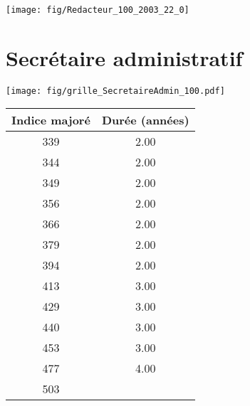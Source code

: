  \vspace{0.1cm} 

 {\hspace{-2.2cm}\texttt{[image: fig/Redacteur\_100\_2003\_22\_0]}} 

\newpage 
 
\chapter{Secrétaire administratif} 

\begin{minipage}{0.55\linewidth}\texttt{[image: fig/grille\_SecretaireAdmin\_100.pdf]}\end{minipage} 
\begin{minipage}{0.3\linewidth} 
 \begin{center} 

\begin{tabular}[htb]{|c|c|} 
\hline 
 Indice majoré &  Durée (années) \\ 
\hline \hline 
 339 &  2.00 \\ 
\hline 
 344 &  2.00 \\ 
\hline 
 349 &  2.00 \\ 
\hline 
 356 &  2.00 \\ 
\hline 
 366 &  2.00 \\ 
\hline 
 379 &  2.00 \\ 
\hline 
 394 &  2.00 \\ 
\hline 
 413 &  3.00 \\ 
\hline 
 429 &  3.00 \\ 
\hline 
 440 &  3.00 \\ 
\hline 
 453 &  3.00 \\ 
\hline 
 477 &  4.00 \\ 
\hline 
 503 &   \\ 
\hline 
\hline 
\end{tabular} 
\end{center} 
 \end{minipage} 

~\\ 
 


   
 \localtableofcontents 

